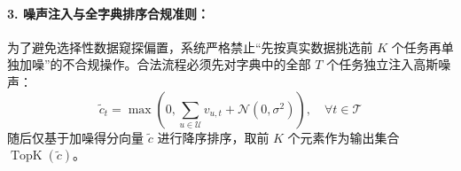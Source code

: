 \paragraph{3. 噪声注入与全字典排序合规准则：}
为了避免选择性数据窥探偏置，系统严格禁止“先按真实数据挑选前 $K$ 个任务再单独加噪”的不合规操作。合法流程必须先对字典中的全部 $T$ 个任务独立注入高斯噪声：
\begin{equation}
  \tilde{c}_t = \max\left(0, \sum_{u \in \mathcal{U}} v_{u, t} + \mathcal{N}(0, \sigma^2)\right), \quad \forall t \in \mathcal{T}
\end{equation}
随后仅基于加噪得分向量 $\tilde{c}$ 进行降序排序，取前 $K$ 个元素作为输出集合 $\operatorname{TopK}(\tilde{c})$。
